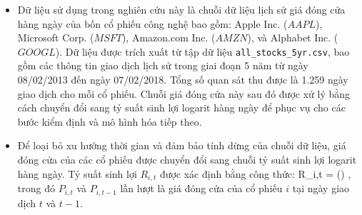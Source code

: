 \begin{itemize}
    \item Dữ liệu sử dụng trong nghiên cứu này là chuỗi dữ liệu lịch sử giá đóng cửa hàng ngày của bốn cổ phiếu công nghệ bao gồm: Apple Inc. ($AAPL$), Microsoft Corp. ($MSFT$), Amazon.com Inc. ($AMZN$), và Alphabet Inc. ($GOOGL$). Dữ liệu được trích xuất từ tập dữ liệu \texttt{all\_stocks\_5yr.csv}, bao gồm các thông tin giao dịch lịch sử trong giai đoạn 5 năm từ ngày 08/02/2013 đến ngày 07/02/2018. Tổng số quan sát thu được là 1.259 ngày giao dịch cho mỗi cổ phiếu. Chuỗi giá đóng cửa này sau đó được xử lý bằng cách chuyển đổi sang tỷ suất sinh lợi logarit hàng ngày để phục vụ cho các bước kiểm định và mô hình hóa tiếp theo.
    \item Để loại bỏ xu hướng thời gian và đảm bảo tính dừng của chuỗi dữ liệu, giá đóng cửa của các cổ phiếu được chuyển đổi sang chuỗi tỷ suất sinh lợi logarit hàng ngày. Tỷ suất sinh lợi $R_{i,t}$ được xác định bằng công thức:
    \bea 
    R_{i,t} = \ln\left(\right) ,
    \eea
    trong đó $P_{i,t}$ và $P_{i,t-1}$ lần lượt là giá đóng cửa của cổ phiếu $i$ tại ngày giao dịch $t$ và $t-1$.
\end{itemize}
\cite{black1973pricing}